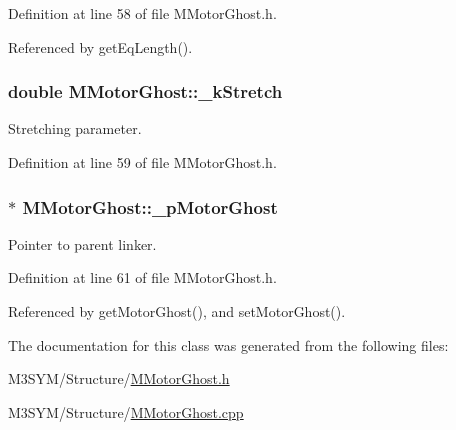 Definition at line 58 of file M\+Motor\+Ghost.\+h.



Referenced by get\+Eq\+Length().

\hypertarget{classMMotorGhost_ac4dd3bd5770e8e7793b1f1a8413ab9e6}{
\subsubsection[{\+\_\+k\+Stretch}]{\setlength{\rightskip}{0pt plus 5cm}double M\+Motor\+Ghost\+::\+\_\+k\+Stretch\hspace{0.3cm}{\ttfamily [private]}}}\label{classMMotorGhost_ac4dd3bd5770e8e7793b1f1a8413ab9e6}


Stretching parameter. 



Definition at line 59 of file M\+Motor\+Ghost.\+h.

\hypertarget{classMMotorGhost_a3c22024539ed93368cd83cda70e075a4}{
\subsubsection[{\+\_\+p\+Motor\+Ghost}]{$\ast$ M\+Motor\+Ghost\+::\+\_\+p\+Motor\+Ghost\hspace{0.3cm}{\ttfamily [private]}}}\label{classMMotorGhost_a3c22024539ed93368cd83cda70e075a4}


Pointer to parent linker. 



Definition at line 61 of file M\+Motor\+Ghost.\+h.



Referenced by get\+Motor\+Ghost(), and set\+Motor\+Ghost().



The documentation for this class was generated from the following files\+:\begin{DoxyCompactItemize}
\item 
M3\+S\+Y\+M/\+Structure/\hyperlink{MMotorGhost_8h}{M\+Motor\+Ghost.\+h}\item 
M3\+S\+Y\+M/\+Structure/\hyperlink{MMotorGhost_8cpp}{M\+Motor\+Ghost.\+cpp}\end{DoxyCompactItemize}
